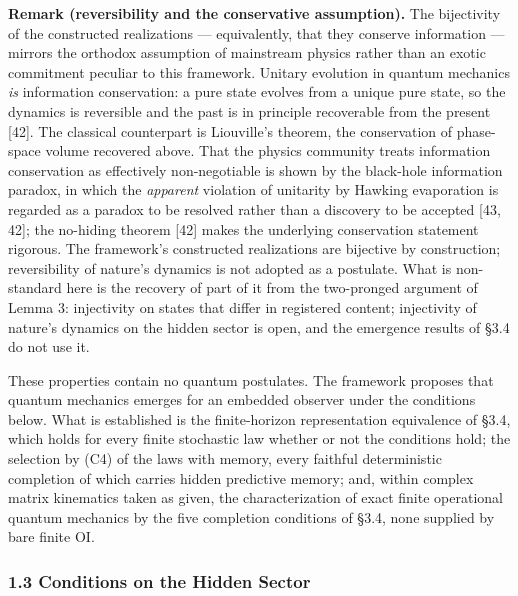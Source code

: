 \documentclass[
]{article}
\begin{document}
\textbf{Remark (reversibility and the conservative assumption).} The
bijectivity of the constructed realizations --- equivalently, that they
conserve information --- mirrors the orthodox assumption of mainstream
physics rather than an exotic commitment peculiar to this framework.
Unitary evolution in quantum mechanics \emph{is} information
conservation: a pure state evolves from a unique pure state, so the
dynamics is reversible and the past is in principle recoverable from the
present {[}42{]}. The classical counterpart is Liouville's theorem, the
conservation of phase-space volume recovered above. That the physics
community treats information conservation as effectively non-negotiable
is shown by the black-hole information paradox, in which the
\emph{apparent} violation of unitarity by Hawking evaporation is
regarded as a paradox to be resolved rather than a discovery to be
accepted {[}43, 42{]}; the no-hiding theorem {[}42{]} makes the
underlying conservation statement rigorous. The framework's constructed
realizations are bijective by construction; reversibility of nature's
dynamics is not adopted as a postulate. What is non-standard here is the
recovery of part of it from the two-pronged argument of Lemma 3:
injectivity on states that differ in registered content; injectivity of
nature's dynamics on the hidden sector is open, and the emergence
results of §3.4 do not use it.

These properties contain no quantum postulates. The framework proposes
that quantum mechanics emerges for an embedded observer under the
conditions below. What is established is the finite-horizon
representation equivalence of §3.4, which holds for every finite
stochastic law whether or not the conditions hold; the selection by (C4)
of the laws with memory, every faithful deterministic completion of
which carries hidden predictive memory; and, within complex matrix
kinematics taken as given, the characterization of exact finite
operational quantum mechanics by the five completion conditions of §3.4,
none supplied by bare finite OI.

\hypertarget{conditions-on-the-hidden-sector}{%
\subsubsection{1.3 Conditions on the Hidden
Sector}\label{conditions-on-the-hidden-sector}}
\end{document}
